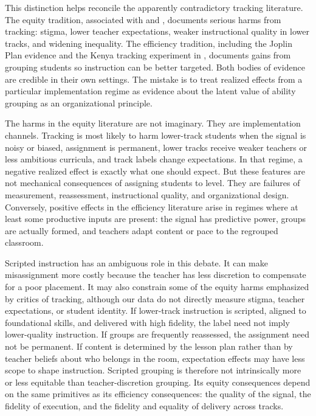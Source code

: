 \documentclass[11pt]{article}
\begin{document}
This distinction helps reconcile the apparently contradictory tracking literature. The equity tradition, associated with \citet{oakes1985} and \citet{gamoran1992}, documents serious harms from tracking: stigma, lower teacher expectations, weaker instructional quality in lower tracks, and widening inequality. The efficiency tradition, including the Joplin Plan evidence and the Kenya tracking experiment in \citet{duflo2011peer}, documents gains from grouping students so instruction can be better targeted. Both bodies of evidence are credible in their own settings. The mistake is to treat realized effects from a particular implementation regime as evidence about the latent value of ability grouping as an organizational principle.

The harms in the equity literature are not imaginary. They are implementation channels. Tracking is most likely to harm lower-track students when the signal is noisy or biased, assignment is permanent, lower tracks receive weaker teachers or less ambitious curricula, and track labels change expectations. In that regime, a negative realized effect is exactly what one should expect. But these features are not mechanical consequences of assigning students to level. They are failures of measurement, reassessment, instructional quality, and organizational design. Conversely, positive effects in the efficiency literature arise in regimes where at least some productive inputs are present: the signal has predictive power, groups are actually formed, and teachers adapt content or pace to the regrouped classroom.

Scripted instruction has an ambiguous role in this debate. It can make misassignment more costly because the teacher has less discretion to compensate for a poor placement. It may also constrain some of the equity harms emphasized by critics of tracking, although our data do not directly measure stigma, teacher expectations, or student identity. If lower-track instruction is scripted, aligned to foundational skills, and delivered with high fidelity, the label need not imply lower-quality instruction. If groups are frequently reassessed, the assignment need not be permanent. If content is determined by the lesson plan rather than by teacher beliefs about who belongs in the room, expectation effects may have less scope to shape instruction. Scripted grouping is therefore not intrinsically more or less equitable than teacher-discretion grouping. Its equity consequences depend on the same primitives as its efficiency consequences: the quality of the signal, the fidelity of execution, and the fidelity and equality of delivery across tracks.
\end{document}
